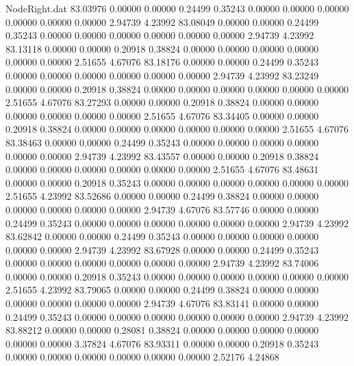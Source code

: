 \begin{filecontents}{NodeRight.dat}
  83.03976    0.00000    0.00000     0.24499    0.35243    0.00000    0.00000    0.00000    0.00000    0.00000    0.00000    2.94739    4.23992
  83.08049    0.00000    0.00000     0.24499    0.35243    0.00000    0.00000    0.00000    0.00000    0.00000    0.00000    2.94739    4.23992
  83.13118    0.00000    0.00000     0.20918    0.38824    0.00000    0.00000    0.00000    0.00000    0.00000    0.00000    2.51655    4.67076
  83.18176    0.00000    0.00000     0.24499    0.35243    0.00000    0.00000    0.00000    0.00000    0.00000    0.00000    2.94739    4.23992
  83.23249    0.00000    0.00000     0.20918    0.38824    0.00000    0.00000    0.00000    0.00000    0.00000    0.00000    2.51655    4.67076
  83.27293    0.00000    0.00000     0.20918    0.38824    0.00000    0.00000    0.00000    0.00000    0.00000    0.00000    2.51655    4.67076
  83.34405    0.00000    0.00000     0.20918    0.38824    0.00000    0.00000    0.00000    0.00000    0.00000    0.00000    2.51655    4.67076
  83.38463    0.00000    0.00000     0.24499    0.35243    0.00000    0.00000    0.00000    0.00000    0.00000    0.00000    2.94739    4.23992
  83.43557    0.00000    0.00000     0.20918    0.38824    0.00000    0.00000    0.00000    0.00000    0.00000    0.00000    2.51655    4.67076
  83.48631    0.00000    0.00000     0.20918    0.35243    0.00000    0.00000    0.00000    0.00000    0.00000    0.00000    2.51655    4.23992
  83.52686    0.00000    0.00000     0.24499    0.38824    0.00000    0.00000    0.00000    0.00000    0.00000    0.00000    2.94739    4.67076
  83.57746    0.00000    0.00000     0.24499    0.35243    0.00000    0.00000    0.00000    0.00000    0.00000    0.00000    2.94739    4.23992
  83.62842    0.00000    0.00000     0.24499    0.35243    0.00000    0.00000    0.00000    0.00000    0.00000    0.00000    2.94739    4.23992
  83.67928    0.00000    0.00000     0.24499    0.35243    0.00000    0.00000    0.00000    0.00000    0.00000    0.00000    2.94739    4.23992
  83.74006    0.00000    0.00000     0.20918    0.35243    0.00000    0.00000    0.00000    0.00000    0.00000    0.00000    2.51655    4.23992
  83.79065    0.00000    0.00000     0.24499    0.38824    0.00000    0.00000    0.00000    0.00000    0.00000    0.00000    2.94739    4.67076
  83.83141    0.00000    0.00000     0.24499    0.35243    0.00000    0.00000    0.00000    0.00000    0.00000    0.00000    2.94739    4.23992
  83.88212    0.00000    0.00000     0.28081    0.38824    0.00000    0.00000    0.00000    0.00000    0.00000    0.00000    3.37824    4.67076
  83.93311    0.00000    0.00000     0.20918    0.35243    0.00000    0.00000    0.00000    0.00000    0.00000    0.00000    2.52176    4.24868

\end{filecontents}
